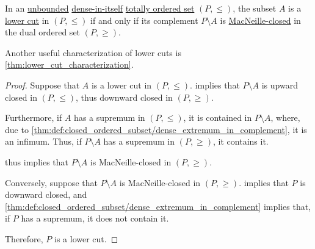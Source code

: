 \begin{proposition}\label{thm:lower_cut_complements}
  In an \hyperref[def:extremal_points/bounds]{unbounded} \hyperref[def:dense_total_order]{dense-in-itself} \hyperref[def:totally_ordered_set]{totally ordered set} \( (P, \leq) \), the subset \( A \) is a \hyperref[def:lower_cut]{lower cut} in \( (P, \leq) \) if and only if its complement \( P \setminus A \) is \hyperref[def:macnielle_closure]{MacNeille-closed} in the dual ordered set \( (P, \geq) \).
\end{proposition}
\begin{comments}
  \item Another useful characterization of lower cuts is \cref{thm:lower_cut_characterization}.
\end{comments}
\begin{proof}
  \SufficiencySubProof Suppose that \( A \) is a lower cut in \( (P, \leq) \).  implies that \( P \setminus A \) is upward closed in \( (P, \leq) \), thus downward closed in \( (P, \geq) \).

  Furthermore, if \( A \) has a supremum in \( (P, \leq) \), it is contained in \( P \setminus A \), where, due to \cref{thm:def:closed_ordered_subset/dense_extremum_in_complement}, it is an infimum. Thus, if \( P \setminus A \) has a supremum in \( (P, \geq) \), it contains it.

   thus implies that \( P \setminus A \) is MacNeille-closed in \( (P, \geq) \).

  \NecessitySubProof Conversely, suppose that \( P \setminus A \) is MacNeille-closed in \( (P, \geq) \).  implies that \( P \) is downward closed, and \cref{thm:def:closed_ordered_subset/dense_extremum_in_complement} implies that, if \( P \) has a supremum, it does not contain it.

  Therefore, \( P \) is a lower cut.
\end{proof}

